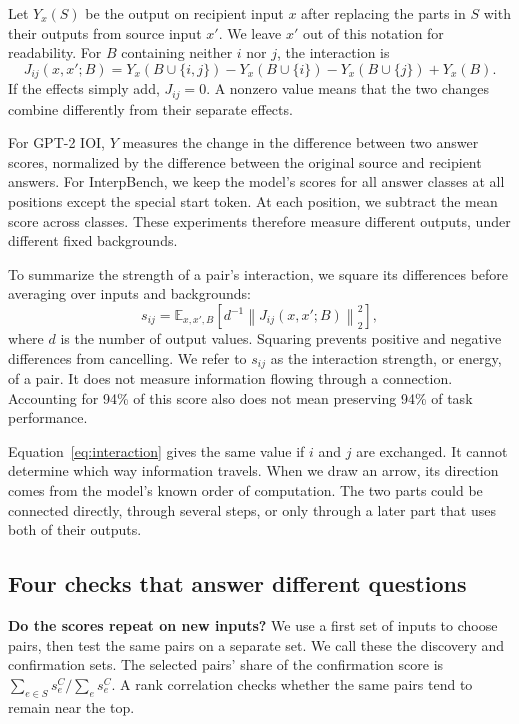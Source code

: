 \documentclass[11pt]{article}
\newcommand{\E}{\mathbb E}
\newcommand{\norm}[1]{\left\lVert#1\right\rVert}
\begin{document}
Let $Y_x(S)$ be the output on recipient input $x$ after replacing the parts in
$S$ with their outputs from source input $x'$. We leave $x'$ out of this
notation for readability. For $B$ containing neither $i$ nor $j$, the
interaction is
\begin{equation}
 J_{ij}(x,x';B)=Y_x(B\cup\{i,j\})-Y_x(B\cup\{i\})
             -Y_x(B\cup\{j\})+Y_x(B).
 \label{eq:interaction}
\end{equation}
If the effects simply add, $J_{ij}=0$. A nonzero value means that the two
changes combine differently from their separate effects.

For GPT-2 IOI, $Y$ measures the change in the difference between two answer
scores, normalized by the difference between the original source and recipient
answers. For InterpBench, we keep the model's scores for all answer classes at
all positions except the special start token. At each position, we subtract
the mean score across classes. These experiments therefore measure different
outputs, under different fixed backgrounds.

To summarize the strength of a pair's interaction, we square its differences
before averaging over inputs and backgrounds:
\begin{equation}
 s_{ij}=\E_{x,x',B}\!\left[d^{-1}\norm{J_{ij}(x,x';B)}_2^2\right],
 \label{eq:energy}
\end{equation}
where $d$ is the number of output values. Squaring prevents positive and
negative differences from cancelling. We refer to $s_{ij}$ as the interaction
strength, or energy, of a pair. It does not measure information flowing through
a connection. Accounting for 94\% of this score also does not mean preserving
94\% of task performance.

Equation~\ref{eq:interaction} gives the same value if $i$ and $j$ are exchanged.
It cannot determine which way information travels. When we draw an arrow, its
direction comes from the model's known order of computation. The two parts
could be connected directly, through several steps, or only through a later
part that uses both of their outputs.

\subsection{Four checks that answer different questions}
\textbf{Do the scores repeat on new inputs?} We use a first set of inputs to
choose pairs, then test the same pairs on a separate set. We call these the
discovery and confirmation sets. The selected pairs' share of the confirmation
score is $\sum_{e\in S}s_e^{C}/\sum_e s_e^{C}$. A rank correlation checks whether
the same pairs tend to remain near the top.
\end{document}

